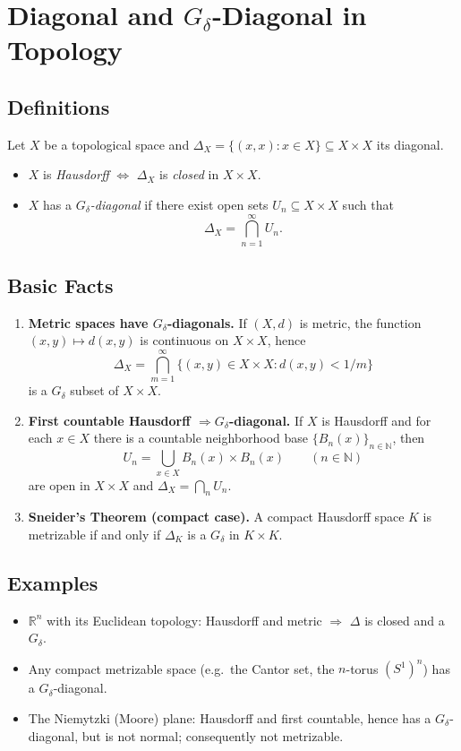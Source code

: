 \documentclass[12pt,a4paper]{article}
\theoremstyle{plain}
\theoremstyle{definition}
\theoremstyle{remark}
\theoremstyle{remark}
\begin{document}
	\section*{Diagonal and $G_\delta$-Diagonal in Topology}
	
	\subsection*{Definitions}
	Let $X$ be a topological space and $\Delta_X=\{(x,x):x\in X\}\subseteq X\times X$ its diagonal.
	\begin{itemize}
		\item $X$ is \emph{Hausdorff} $\iff$ $\Delta_X$ is \emph{closed} in $X\times X$.
		\item $X$ has a \emph{$G_\delta$-diagonal} if there exist open sets $U_n\subseteq X\times X$ such that
		\[
		\Delta_X=\bigcap_{n=1}^\infty U_n .
		\]
	\end{itemize}
	
	\subsection*{Basic Facts}
	\begin{enumerate}
		\item \textbf{Metric spaces have $G_\delta$-diagonals.}
		If $(X,d)$ is metric, the function $(x,y)\mapsto d(x,y)$ is continuous on $X\times X$, hence
		\[
		\Delta_X=\bigcap_{m=1}^{\infty}\bigl\{(x,y)\in X\times X: d(x,y)<1/m\bigr\}
		\]
		is a $G_\delta$ subset of $X\times X$.
		\item \textbf{First countable Hausdorff $\Rightarrow G_\delta$-diagonal.}
		If $X$ is Hausdorff and for each $x\in X$ there is a countable neighborhood base $\{B_n(x)\}_{n\in\mathbb{N}}$, then
		\[
		U_n=\bigcup_{x\in X} B_n(x)\times B_n(x)\qquad(n\in\mathbb{N})
		\]
		are open in $X\times X$ and $\Delta_X=\bigcap_{n} U_n$.
		\item \textbf{Sneider’s Theorem (compact case).}
		A compact Hausdorff space $K$ is metrizable if and only if $\Delta_K$ is a $G_\delta$ in $K\times K$.
	\end{enumerate}
	
	\subsection*{Examples}
	\begin{itemize}
		\item $\mathbb{R}^n$ with its Euclidean topology: Hausdorff and metric $\Rightarrow$ $\Delta$ is closed and a $G_\delta$.
		\item Any compact metrizable space (e.g.\ the Cantor set, the $n$-torus $(S^1)^n$) has a $G_\delta$-diagonal.
		\item The Niemytzki (Moore) plane: Hausdorff and first countable, hence has a $G_\delta$-diagonal, but is not normal; consequently not metrizable.
	\end{itemize}
	
\end{document}
